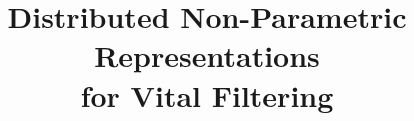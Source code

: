 \documentclass{sig-alternate}
\begin{document}
 

%

\title{Distributed Non-Parametric Representations\\ for Vital Filtering}
%
%
%
%
%
\end{document}
